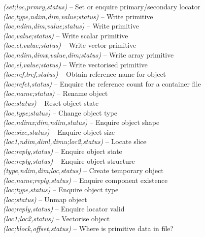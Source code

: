 \documentclass[twoside,11pt]{starlink}
\providecommand{\st}[1]{{\emph{#1}}}
\begin{document}
\textbf{}\st{(set;loc,prmry,status)} -- Set or enquire
primary/secondary locator \\
\textbf{}\st{(loc,type,ndim,dim,value;status)} -- Write primitive \\
\textbf{}\st{(loc,ndim,dim,value;status)} -- Write primitive \\
\textbf{}\st{(loc,value;status)} -- Write scalar primitive\\
\textbf{}\st{(loc,el,value;status)} -- Write vector primitive\\
\textbf{}\st{(loc,ndim,dimx,value,dim;status)} -- Write array primitive\\
\textbf{}\st{(loc,el,value;status)} -- Write vectorised primitive\\
\textbf{}\st{(loc;ref,lref,status)} -- Obtain reference name for object \\
\textbf{}\st{(loc;refct,status)} -- Enquire the reference count for
a container file \\
\textbf{}\st{(loc,name;status)} -- Rename object \\
\textbf{}\st{(loc;status)} -- Reset object state \\
\textbf{}\st{(loc,type;status)} -- Change object type \\
\textbf{}\st{(loc,ndimx;dim,ndim,status)} -- Enquire object shape \\
\textbf{}\st{(loc;size,status)} -- Enquire object size \\
\textbf{}\st{(loc1,ndim,diml,dimu;loc2,status)} -- Locate slice \\
\textbf{}\st{(loc;reply,status)} -- Enquire object state \\
\textbf{}\st{(loc;reply,status)} -- Enquire object structure \\
\textbf{}\st{(type,ndim,dim;loc,status)} -- Create temporary object \\
\textbf{}\st{(loc,name;reply,status)} -- Enquire component existence \\
\textbf{}\st{(loc;type,status)} -- Enquire object type \\
\textbf{}\st{(loc;status)} -- Unmap object \\
\textbf{}\st{(loc;reply,status)} -- Enquire locator valid \\
\textbf{}\st{(loc1;loc2,status)} -- Vectorise object \\
\textbf{}\st{(loc;block,offset,status)} -- Where is primitive data in file? \\
\end{document}
